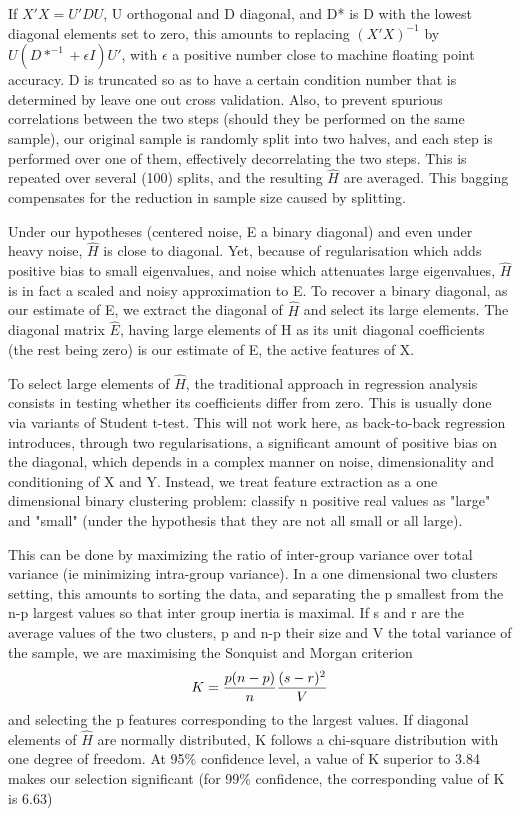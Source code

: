 \documentclass{article}
\begin{document}
If $X'X=U'DU$, U orthogonal and D diagonal, and D* is D with the lowest diagonal elements set to zero, this amounts to replacing $(X'X)^{-1}$ by $U(D*^{-1}+\epsilon I)U'$, with $\epsilon$ a positive number close to machine floating point accuracy. D is truncated so as to have a certain condition number that is determined by leave one out cross validation.
%
Also, to prevent spurious correlations between the two steps (should they be performed on the same sample), our original sample is randomly split into two halves, and each step is performed over one of them, effectively decorrelating the two steps.
%
This is repeated over several (100) splits, and the resulting $\hat H$ are averaged.
%
This bagging compensates for the reduction in sample size caused by splitting.

Under our hypotheses (centered noise, E a binary diagonal) and even under heavy noise, $\hat H$ is close to diagonal.
%
Yet, because of regularisation which adds positive bias to small eigenvalues, and noise which attenuates large eigenvalues, $\hat H$ is in fact a scaled and noisy approximation to E.
%
To recover a binary diagonal, as our estimate of E, we extract the diagonal of $\hat H$ and select its large elements.
%
The diagonal matrix $\hat E$, having large elements of H as its unit diagonal coefficients (the rest being zero) is our estimate of E, the active features of X.

To select large elements of $\hat H$, the traditional approach in regression analysis consists in testing whether its coefficients differ from zero. This is usually done via variants of Student t-test.
%
This will not work here, as back-to-back regression introduces, through two regularisations, a significant amount of positive bias on the diagonal, which depends in a complex manner on noise, dimensionality and conditioning of X and Y.
%
Instead, we treat feature extraction as a one dimensional binary clustering problem: classify n positive real values as "large" and "small" (under the hypothesis that they are not all small or all large).

This can be done by maximizing the ratio of inter-group variance over total variance (ie minimizing intra-group variance).
%
In a one dimensional two clusters setting, this amounts to sorting the data, and separating the p smallest from the n-p largest values so that inter group inertia is maximal.
%
If s and r are the average values of the two clusters, p and n-p their size and V the total variance of the sample, we are maximising the Sonquist and Morgan criterion $$K = {p (n-p) \over n} {(s-r)^2 \over V}$$ and selecting the p features corresponding to the largest values.
%
If diagonal elements of $\hat H$ are normally distributed, K follows a chi-square distribution with one degree of freedom.
%
At 95\% confidence level, a value of K superior to 3.84 makes our selection significant (for 99\% confidence, the corresponding value of K is 6.63) \citep{Kass_75}
\end{document}
